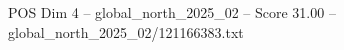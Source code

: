 \begin{textsample}{POS Dim 4 – global\_north\_2025\_02 – Score 31.00 – global\_north\_2025\_02/121166383.txt}
\end{textsample}

